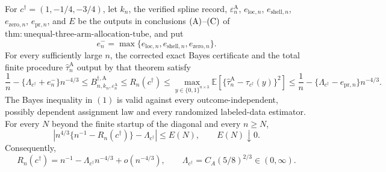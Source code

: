 For \(c^\dagger=(1,-1/4,-3/4)\), let \(k_n\), the verified spline record, \(\varepsilon_n^{\mathrm A}\), \(e_{\mathrm{loc},n}\), \(e_{\mathrm{shell},n}\), \(e_{\mathrm{zero},n}\), \(e_{\mathrm{pr},n}\), and \(E\) be the outputs in conclusions \({\rm(A)}\)--\({\rm(C)}\) of \(\mathrm{thm:unequal\text{-}three\text{-}arm\text{-}allocation\text{-}tube}\), and put
\[
 e_n^- = \max\{e_{\mathrm{loc},n},e_{\mathrm{shell},n},e_{\mathrm{zero},n}\}.
\]
For every sufficiently large \(n\), the corrected exact Bayes certificate and the total finite procedure \(\widehat\tau_n^{\mathrm A}\) output by that theorem satisfy
\[
 \frac1n-\{\Lambda_{c^\dagger}+e_n^-\}n^{-4/3}
 \le B_{n,k_n,\varepsilon_n^{\mathrm A}}^{\dagger,\mathrm A}
 \le R_n(c^\dagger)
 \le \max_{y\in\{0,1\}^{n\times3}}
       \mathbb E\!\left[
       \{\widehat\tau_n^{\mathrm A}-\tau_{c^\dagger}(y)\}^2
       \right]
 \le \frac1n-\{\Lambda_{c^\dagger}-e_{\mathrm{pr},n}\}n^{-4/3}.
 \tag{1}
\]
The Bayes inequality in \((1)\) is valid against every outcome-independent, possibly dependent assignment law and every randomized labeled-data estimator.  For every \(N\) beyond the finite startup of the diagonal and every \(n\ge N\),
\[
 \left|n^{4/3}\{n^{-1}-R_n(c^\dagger)\}
       -\Lambda_{c^\dagger}\right|\le E(N),
 \qquad E(N)\downarrow0.
 \tag{2}
\]
Consequently,
\[
 R_n(c^\dagger)=n^{-1}-\Lambda_{c^\dagger}n^{-4/3}
 +o(n^{-4/3}),
 \qquad
 \Lambda_{c^\dagger}=C_A(5/8)^{2/3}\in(0,\infty).
\]

